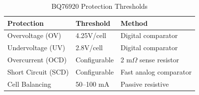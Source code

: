 \begin{table}[H]
\centering
\caption{BQ76920 Protection Thresholds}
\begin{tabular}{@{}lll@{}}
\toprule
\textbf{Protection} & \textbf{Threshold} & \textbf{Method} \\
\midrule
Overvoltage (OV) & 4.25V/cell & Digital comparator \\
Undervoltage (UV) & 2.8V/cell & Digital comparator \\
Overcurrent (OCD) & Configurable & 2 m$\Omega$ sense resistor \\
Short Circuit (SCD) & Configurable & Fast analog comparator \\
Cell Balancing & 50--100 mA & Passive resistive \\
\bottomrule
\end{tabular}
\end{table}

